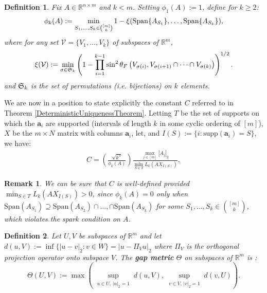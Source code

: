 \documentclass[journal, onecolumn]{IEEEtran}
\newtheorem{definition}{Definition}
\newtheorem{remark}{Remark}
\begin{document}
\begin{definition}\label{SpecialSupportSet}
Fix $A \in \mathbb{R}^{n \times m}$ and $k < m$. Setting $\phi_1(A) := 1$, define for $k \geq 2$:
\begin{align}\label{rho}
\phi_k(A) := \min_{ S_1,\ldots,S_k \in {[m] \choose k} } 1 - \xi( \text{\rm Span}\{A_{S_1}\}, \ldots,  \text{\rm Span}\{A_{S_k}\}),
\end{align}
where for any set $\mathcal{V} = \{V_1, \ldots, V_k\}$ of subspaces of $\mathbb{R}^m$, 
\begin{align}\label{xidef}
\xi(\mathcal{V}) := \min_{\sigma \in \frak{S}_k} \left(1 - \prod_{i=1}^{k-1} \sin^2  \theta_F \left(V_{\sigma(i)}, V_{\sigma(i+1)} \cap \cdots \cap V_{\sigma(k)}\right)  \right)^{1/2}.
\end{align}
%
and $\frak{S}_{k}$ is the set of permutations (i.e. bijections) on $k$ elements. 
\end{definition}



We are now in a position to state explicitly the constant $C$ referred to in Theorem \ref{DeterministicUniquenessTheorem}. Letting $T$ be the set of supports on which the $\mathbf{a}_i$ are supported (intervals of length $k$ in some cyclic ordering of $[m]$), $X$ be the $m \times N$ matrix with columns $\mathbf{a}_i$, let, and $I(S) := \{i : \text{supp}(\mathbf{a}_i) = S\}$, we have:
\begin{align}\label{Cdef}
C = \left( \frac{ \sqrt{k^3}}{ \phi_k(A) } \right) \frac{\max_{j \in [m]} |A_j|_2}{\min_{S \in T} L_k(AX_{I(S)})}, 
\end{align}

\begin{remark}\label{nonzero}
We can be sure that $C$ is well-defined provided $\min_{S \in T} L_k(AX_{I(S)}) > 0$, since $\phi_k(A) = 0$ only when $\text{Span}(A_{S_1}) \supseteq \text{Span}(A_{S_2}) \cap \ldots, \cap \text{Span}(A_{S_k})$ for some $S_1, \ldots, S_k \in {[m] \choose k}$, which violates the spark condition on $A$.
\end{remark}

\begin{definition}\label{GapMetricDef}
Let $U, V$ be subspaces of $\mathbb{R}^m$ and let $d(u,V) := \inf\{|u-v|_2: v \in W\} = |u - \Pi_V u|_2$ where $\Pi_V$ is the orthogonal projection operator onto subspace $V$. The \textbf{gap metric} $\Theta$ on subspaces of $\mathbb{R}^{m}$ is \cite{akhiezer2013theory}:
\begin{equation}\label{SubspaceMetric}
\Theta(U,V) := \max\left( \sup_{\substack{u \in U, \, |u|_2 = 1}} d(u,V), \sup_{\substack{v \in V, \, |v|_2 = 1}} d(v,U) \right).
\end{equation}
\end{definition}
\end{document}
